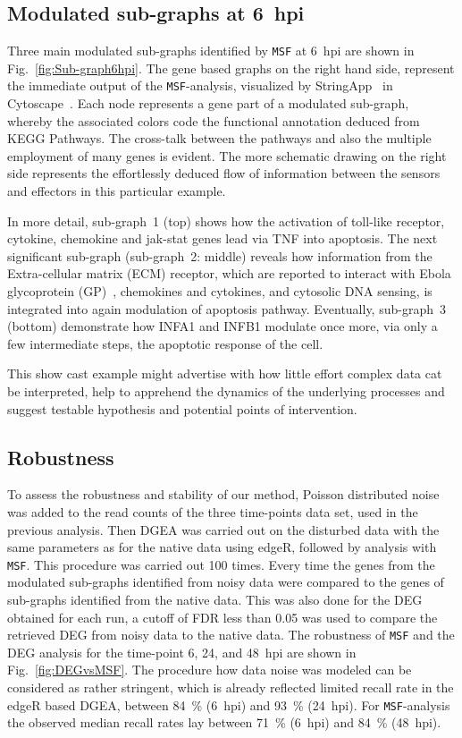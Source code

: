 \documentclass[10pt,a4paper,twocolumn]{article}
\begin{document}
\subsection*{Modulated sub-graphs at 6~hpi}

 Three main modulated sub-graphs identified by \texttt{MSF} at 6~hpi
 are shown in Fig.~\ref{fig:Sub-graph6hpi}. The gene based graphs on
 the right hand side, represent the immediate output of the
 \texttt{MSF}-analysis, visualized by StringApp~\cite{StringApp} in
 Cytoscape~\cite{Cyto}. Each node represents a gene part of a
 modulated sub-graph, whereby the associated colors code the
 functional annotation deduced from KEGG Pathways. The cross-talk
 between the pathways and also the multiple employment of many genes
 is evident. The more schematic drawing on the right side represents
 the effortlessly deduced flow of information between the sensors and
 effectors in this particular example.

 In more detail, sub-graph~1 (top) shows how the activation of
 toll-like receptor, cytokine, chemokine and jak-stat genes lead via
 TNF into apoptosis. The next significant sub-graph (sub-graph~2:
 middle) reveals how information from the Extra-cellular matrix (ECM)
 receptor, which are reported to interact with Ebola glycoprotein
 (GP)~\cite{Veljkovic}, chemokines and cytokines, and cytosolic DNA
 sensing, is integrated into again modulation of apoptosis
 pathway. Eventually, sub-graph~3 (bottom) demonstrate how INFA1 and
 INFB1 modulate once more, via only a few intermediate steps, the
 apoptotic response of the cell.

 This show cast example might advertise with how little effort complex
 data cat be interpreted, help to apprehend the dynamics of the
 underlying processes and suggest testable hypothesis and potential
 points of intervention.
 
 \subsection*{Robustness}
 
 To assess the robustness and stability of our method, Poisson
 distributed noise was added to the read counts of the three
 time-points data set, used in the previous analysis. Then DGEA was
 carried out on the disturbed data with the same parameters as for the
 native data using edgeR, followed by analysis with \texttt{MSF}. This
 procedure was carried out 100 times.  Every time the genes from the
 modulated sub-graphs identified from noisy data were compared to the
 genes of sub-graphs identified from the native data. This was also
 done for the DEG obtained for each run, a cutoff of FDR less than
 0.05 was used to compare the retrieved DEG from noisy data to the
 native data.  The robustness of \texttt{MSF} and the DEG analysis for
 the time-point 6, 24, and 48~hpi are shown in
 Fig.~\ref{fig:DEGvsMSF}. The procedure how data noise was modeled can
 be considered as rather stringent, which is already reflected limited
 recall rate in the edgeR based DGEA, between 84~\% (6~hpi) and 93~\% (24~hpi). For
 \texttt{MSF}-analysis the observed median recall rates lay between
 71~\% (6~hpi) and 84~\% (48~hpi).
\end{document}
